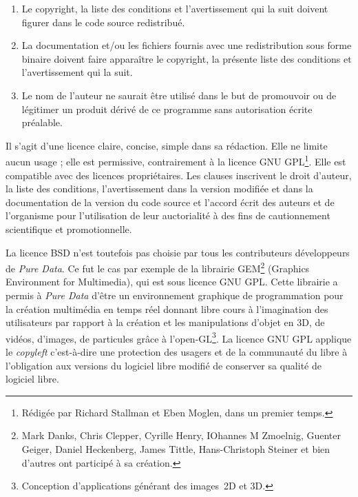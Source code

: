 \documentclass{FramateX}
\begin{document}
\begin{refsection}
\begin{enumerate}
\item Le copyright, la liste des conditions et
l'avertissement qui la suit doivent figurer dans le
code source redistribué.
\item La documentation et/ou les fichiers fournis avec une
redistribution sous forme binaire doivent faire apparaître le
copyright, la présente liste des conditions et
l'avertissement qui la suit.
\item Le nom de l'auteur ne saurait être utilisé dans
le but de promouvoir ou de légitimer un produit dérivé de ce programme
sans autorisation écrite préalable.
\end{enumerate}
Il s'agit d'une licence claire, concise, simple dans sa rédaction. Elle
ne limite aucun usage ; elle est permissive, contrairement à la licence
GNU GPL\footnote{Rédigée par Richard Stallman et Eben Moglen, dans un
premier temps.}. Elle est compatible avec des licences propriétaires.
Les clauses inscrivent le droit d'auteur, la liste des conditions,
l'avertissement dans la version modifiée et dans la documentation de la
version du code source et l'accord écrit des auteurs et de l'organisme
pour l'utilisation de leur auctorialité à des fins de cautionnement
scientifique et promotionnelle. 

La licence BSD n'est toutefois pas choisie par tous les contributeurs
développeurs de \textit{Pure Data}. Ce fut le cas par exemple de la librairie
GEM\footnote{Mark Danks, Chris Clepper, Cyrille Henry, IOhannes M
Zmoelnig, Guenter Geiger, Daniel Heckenberg, James Tittle,
Hans-Christoph Steiner et bien d'autres ont participé à sa création.}
(Graphics Environment for Multimedia), qui est sous licence GNU GPL.
Cette librairie a permis à \textit{Pure Data} d'être un environnement graphique
de programmation pour la création multimédia en temps réel donnant
libre cours à l'imagination des utilisateurs par rapport à la création
et les manipulations d'objet en 3D, de vidéos, d'images, de particules
grâce à l'open-GL\footnote{Conception d'applications
générant des images~2D et 3D.}. La licence GNU GPL applique le
\textit{copyleft} c'est-à-dire une protection des usagers et de la communauté du
libre à l'obligation aux versions du logiciel libre modifié de
conserver sa qualité de logiciel libre.


\end{refsection}
\end{document}
